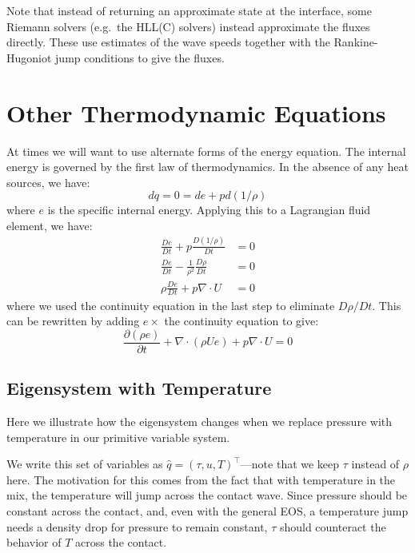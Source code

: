 Note that instead of returning an approximate state at the interface,
some Riemann solvers (e.g.\ the HLL(C) solvers) instead approximate the
fluxes directly.  These use estimates of the wave speeds together with
the Rankine-Hugoniot jump conditions to give the fluxes.



\section{Other Thermodynamic Equations}

At times we will want to use alternate forms of the energy equation.  The
internal energy is governed by the first law of thermodynamics.  In the
absence of any heat sources, we have:
\begin{equation}
dq = 0 = de + pd(1/\rho)
\end{equation}
where $e$ is the specific internal energy.
Applying this to a Lagrangian fluid element, we have:
\begin{align}
\frac{De}{Dt} + p \frac{D(1/\rho)}{Dt} &= 0 \\
\frac{De}{Dt} - \frac{1}{\rho^2} \frac{D\rho}{Dt} &= 0 \\
\rho \frac{De}{Dt} + p \nabla \cdot U &= 0
\end{align}
where we used the continuity equation in the last step to eliminate
$D\rho/Dt$.  This can be rewritten by adding $e \times$ the continuity
equation to give:
\begin{equation}
\frac{\partial (\rho e)}{\partial t} + \nabla \cdot (\rho U e) + p \nabla \cdot U = 0 \label{eq:euler:econs}
\end{equation}


\subsection{Eigensystem with Temperature}

Here we illustrate how the eigensystem changes when we replace pressure with
temperature in our primitive variable system.

We write this set of variables as $\hat{q} = (\tau, u,
T)^\intercal$---note that we keep $\tau$ instead of $\rho$ here.  The
motivation for this comes from the fact that with temperature in the
mix, the temperature will jump across the contact wave.  Since
pressure should be constant across the contact, and, even with the
general EOS, a temperature jump needs a density drop for pressure to
remain constant, $\tau$ should counteract the behavior of $T$ across
the contact.

